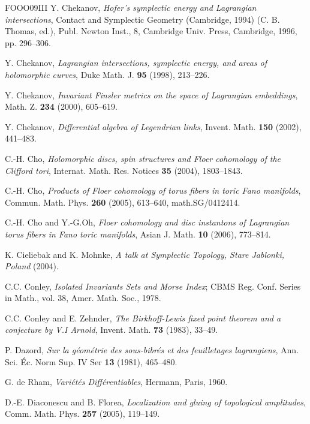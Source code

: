 \begin{thebibliography}{FOOO09III}
 Y. Chekanov, \emph{Hofer's symplectic energy and Lagrangian intersections}, Contact and Symplectic Geometry (Cambridge, 1994) (C. B. Thomas, ed.), Publ. Newton Inst., 8, Cambridge Univ. Press, Cambridge, 1996, pp. 296–306.

 Y. Chekanov, \emph{Lagrangian intersections, symplectic energy, and areas of holomorphic curves}, Duke Math. J. \textbf{95} (1998), 213–226.

 Y. Chekanov, \emph{Invariant Finsler metrics on the space of Lagrangian embeddings}, Math. Z. \textbf{234} (2000), 605–619.

 Y. Chekanov, \emph{Differential algebra of Legendrian links}, Invent. Math. \textbf{150} (2002), 441–483.

 C.-H. Cho, \emph{Holomorphic discs, spin structures and Floer cohomology of the Clifford tori}, Internat. Math. Res. Notices \textbf{35} (2004), 1803–1843.

 C.-H. Cho, \emph{Products of Floer cohomology of torus fibers in toric Fano manifolds}, Commun. Math. Phys. \textbf{260} (2005), 613–640, math.SG/0412414.

 C.-H. Cho and Y.-G.Oh, \emph{Floer cohomology and disc instantons of Lagrangian torus fibers in Fano toric manifolds}, Asian J. Math. \textbf{10} (2006), 773–814.

 K. Cieliebak and K. Mohnke, \emph{A talk at Symplectic Topology, Stare Jablonki, Poland} (2004).

 C.C. Conley, \emph{Isolated Invariants Sets and Morse Index}; CBMS Reg. Conf. Series in Math., vol. 38, Amer. Math. Soc., 1978.

 C.C. Conley and E. Zehnder, \emph{The Birkhoff-Lewis fixed point theorem and a conjecture by V.I Arnold}, Invent. Math. \textbf{73} (1983), 33–49.

 P. Dazord, \emph{Sur la géométrie des sous-bibrés et des feuilletages lagrangiens}, Ann. Sci. Éc. Norm Sup. IV Ser \textbf{13} (1981), 465–480.

 G. de Rham, \emph{Variétés Différentiables}, Hermann, Paris, 1960.

 D.-E. Diaconescu and B. Florea, \emph{Localization and gluing of topological amplitudes}, Comm. Math. Phys. \textbf{257} (2005), 119–149.


\end{thebibliography}
